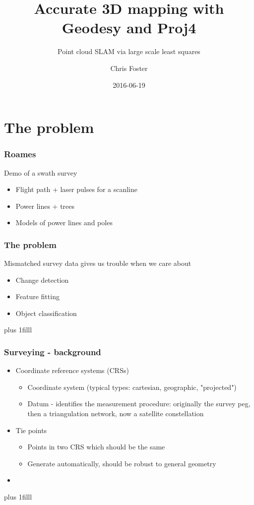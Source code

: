 \documentclass{beamer}
\title[3D mapping with Geodesy]{Accurate 3D mapping with Geodesy and Proj4}
\subtitle{Point cloud SLAM via large scale least squares}
\author{Chris Foster}
\institute{Fugro Roames}
\date{2016-06-19}
\newcommand{\vf}[1]{\vskip0pt plus #1}
\begin{document}
\begin{frame}[plain]
  \titlepage
\end{frame}



\section{The problem}

\begin{frame}
  \frametitle{Roames}
  Demo of a swath survey
  \begin{itemize}
    \item
      Flight path + laser pulses for a scanline
    \item
      Power lines + trees
    \item
      Models of power lines and poles
  \end{itemize}
\end{frame}



\begin{frame}
  \frametitle{The problem}
  Mismatched survey data gives us trouble when we care about
  \begin{itemize}
    \item
      Change detection
    \item
      Feature fitting
    \item
      Object classification
  \end{itemize}
  \vf{1filll}
\end{frame}


\begin{frame}
  \frametitle{Surveying - background}
  \begin{itemize}
    \item
      Coordinate reference systems (CRSs)
      \begin{itemize}
        \item Coordinate system (typical types: cartesian, geographic, "projected")
        \item Datum - identifies the measurement procedure: originally the survey peg, then a triangulation network, now a satellite constellation
      \end{itemize}
    \item
      Tie points
      \begin{itemize}
        \item Points in two CRS which should be the same
        \item Generate automatically, should be robust to general geometry
      \end{itemize}
    \item
  \end{itemize}
  \vf{1filll}
\end{frame}
\end{document}
